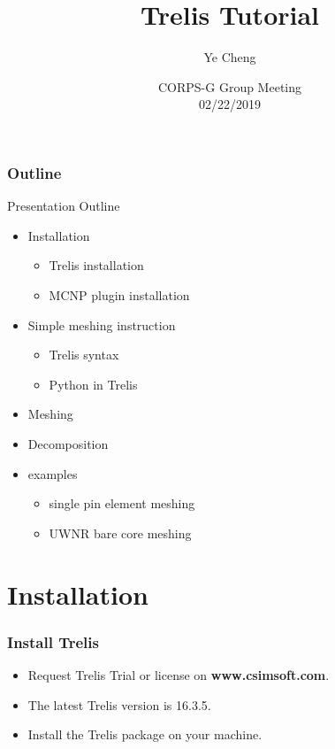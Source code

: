 \documentclass[fleqn]{beamer}
\title[Trelis Tutorial]{
    Trelis Tutorial}
\author[Ye Cheng]{
    Ye Cheng}
\institute[Kansas State University]{
    Mechanical and Nuclear Engineering \\
    Kansas State University}
\date[CORPS-G]{
    CORPS-G Group Meeting \\
    02/22/2019}
\begin{document}
    \newcommand{\beginbackup}{
        \newcounter{framenumbervorappendix}
        \setcounter{framenumbervorappendix}{\value{framenumber}}
    }
    \newcommand{\backupend}{
        \addtocounter{framenumbervorappendix}{-\value{framenumber}}
        \addtocounter{framenumber}{\value{framenumbervorappendix}} 
    }
    
    \begin{frame}
        \titlepage
    \end{frame}
    \begin{frame}
        \frametitle{Outline}
        \begin{block}{Presentation Outline}
            \begin{itemize}
                \item Installation
                \begin{itemize}
                    \item Trelis installation
                    \item MCNP plugin installation
                \end{itemize}
                \item Simple meshing instruction
                \begin{itemize}
                 \item Trelis syntax
                 \item Python in Trelis
                \end{itemize}
                \item Meshing
                \item Decomposition
                \item examples
		  \begin{itemize}
		   \item single pin element meshing
		   \item UWNR bare core meshing
		  \end{itemize}

            \end{itemize}
        \end{block}
    \end{frame}
\section{Installation}
\begin{frame}
 \frametitle{Install Trelis}
 \begin{itemize}
 \item Request Trelis Trial or license on \textbf{www.csimsoft.com}.
 \item The latest Trelis version is 16.3.5.
 \item Install the Trelis package on your machine.
  \end{itemize}
\end{frame}
\end{document}
